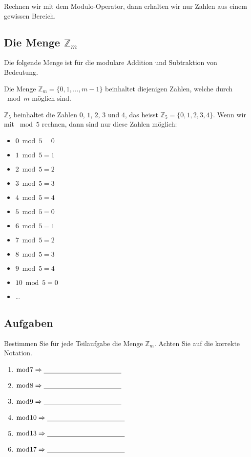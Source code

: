 Rechnen wir mit dem Modulo-Operator, dann erhalten wir nur Zahlen aus einem gewissen Bereich.

\subsection{Die Menge $\mathbb{Z}_m$}

Die folgende Menge ist für die modulare Addition und Subtraktion von Bedeutung.

\begin{definition}[$\mathbb{Z}_m$]
Die Menge $\mathbb{Z}_m = \{0, 1, \dots, m - 1\}$ beinhaltet diejenigen Zahlen, welche durch $\bmod m$ möglich sind.
\end{definition}

\begin{example}
$\mathbb{Z}_5$ beinhaltet die Zahlen $0$, $1$, $2$, $3$ und $4$, das heisst $\mathbb{Z}_5 = \{0, 1, 2, 3, 4 \}$. Wenn wir mit $\bmod 5$ rechnen, dann sind nur diese Zahlen möglich:

\begin{multicols}{3}
\begin{itemize}
\item $0 \bmod 5 = 0$
\item $1 \bmod 5 = 1$
\item $2 \bmod 5 = 2$
\item $3 \bmod 5 = 3$
\item $4 \bmod 5 = 4$
\item $5 \bmod 5 = 0$
\item $6 \bmod 5 = 1$
\item $7 \bmod 5 = 2$
\item $8 \bmod 5 = 3$
\item $9 \bmod 5 = 4$
\item $10 \bmod 5 = 0$
\item \dots
\end{itemize}
\end{multicols}

\end{example}

\subsection{Aufgaben}

Bestimmen Sie für jede Teilaufgabe die Menge $\mathbb{Z}_m$. Achten Sie auf die korrekte Notation.

\begin{multicols}{2}
\begin{enumerate}
	\item $\bmod 7 \Rightarrow \rule[-0.75mm]{4cm}{.5pt}$
	\item $\bmod 8 \Rightarrow \rule[-0.75mm]{4cm}{.5pt}$
	\item $\bmod 9 \Rightarrow \rule[-0.75mm]{4cm}{.5pt}$
	\item $\bmod 10 \Rightarrow \rule[-0.75mm]{4cm}{.5pt}$
	\item $\bmod 13 \Rightarrow \rule[-0.75mm]{4cm}{.5pt}$
	\item $\bmod 17 \Rightarrow \rule[-0.75mm]{4cm}{.5pt}$
\end{enumerate}
\end{multicols}

